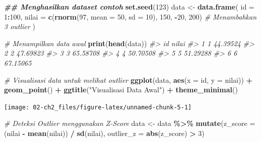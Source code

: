 \documentclass[
  oneside]{book}
\newenvironment{Shaded}{\begin{snugshade}}{\end{snugshade}}
\newcommand{\AttributeTok}[1]{\textcolor[rgb]{0.13,0.29,0.53}{#1}}
\newcommand{\CommentTok}[1]{\textcolor[rgb]{0.56,0.35,0.01}{\textit{#1}}}
\newcommand{\DecValTok}[1]{\textcolor[rgb]{0.00,0.00,0.81}{#1}}
\newcommand{\DocumentationTok}[1]{\textcolor[rgb]{0.56,0.35,0.01}{\textbf{\textit{#1}}}}
\newcommand{\FunctionTok}[1]{\textcolor[rgb]{0.13,0.29,0.53}{\textbf{#1}}}
\newcommand{\NormalTok}[1]{#1}
\newcommand{\OtherTok}[1]{\textcolor[rgb]{0.56,0.35,0.01}{#1}}
\newcommand{\SpecialCharTok}[1]{\textcolor[rgb]{0.81,0.36,0.00}{\textbf{#1}}}
\newcommand{\StringTok}[1]{\textcolor[rgb]{0.31,0.60,0.02}{#1}}
\begin{document}
\begin{Shaded}
\begin{Highlighting}[]
\DocumentationTok{\#\# Menghasilkan dataset contoh}
\FunctionTok{set.seed}\NormalTok{(}\DecValTok{123}\NormalTok{)}
\NormalTok{data }\OtherTok{\textless{}{-}} \FunctionTok{data.frame}\NormalTok{(}
  \AttributeTok{id =} \DecValTok{1}\SpecialCharTok{:}\DecValTok{100}\NormalTok{,}
  \AttributeTok{nilai =} \FunctionTok{c}\NormalTok{(}\FunctionTok{rnorm}\NormalTok{(}\DecValTok{97}\NormalTok{, }\AttributeTok{mean =} \DecValTok{50}\NormalTok{, }\AttributeTok{sd =} \DecValTok{10}\NormalTok{), }\DecValTok{150}\NormalTok{, }\SpecialCharTok{{-}}\DecValTok{20}\NormalTok{, }\DecValTok{200}\NormalTok{)  }\CommentTok{\# Menambahkan 3 outlier}
\NormalTok{)}
\end{Highlighting}
\end{Shaded}

\begin{Shaded}
\begin{Highlighting}[]
\CommentTok{\# Menampilkan data awal}
\FunctionTok{print}\NormalTok{(}\FunctionTok{head}\NormalTok{(data))}
\CommentTok{\#\textgreater{}   id    nilai}
\CommentTok{\#\textgreater{} 1  1 44.39524}
\CommentTok{\#\textgreater{} 2  2 47.69823}
\CommentTok{\#\textgreater{} 3  3 65.58708}
\CommentTok{\#\textgreater{} 4  4 50.70508}
\CommentTok{\#\textgreater{} 5  5 51.29288}
\CommentTok{\#\textgreater{} 6  6 67.15065}
\end{Highlighting}
\end{Shaded}

\begin{Shaded}
\begin{Highlighting}[]
\CommentTok{\# Visualisasi data untuk melihat outlier}
\FunctionTok{ggplot}\NormalTok{(data, }\FunctionTok{aes}\NormalTok{(}\AttributeTok{x =}\NormalTok{ id, }\AttributeTok{y =}\NormalTok{ nilai)) }\SpecialCharTok{+}
  \FunctionTok{geom\_point}\NormalTok{() }\SpecialCharTok{+}
  \FunctionTok{ggtitle}\NormalTok{(}\StringTok{"Visualisasi Data Awal"}\NormalTok{) }\SpecialCharTok{+}
  \FunctionTok{theme\_minimal}\NormalTok{()}
\end{Highlighting}
\end{Shaded}

\begin{center}\texttt{[image: 02-ch2\_files/figure-latex/unnamed-chunk-5-1]} \end{center}

\begin{Shaded}
\begin{Highlighting}[]
\CommentTok{\# Deteksi Outlier menggunakan Z{-}Score}
\NormalTok{data }\OtherTok{\textless{}{-}}\NormalTok{ data }\SpecialCharTok{\%\textgreater{}\%}
  \FunctionTok{mutate}\NormalTok{(}\AttributeTok{z\_score =}\NormalTok{ (nilai }\SpecialCharTok{{-}} \FunctionTok{mean}\NormalTok{(nilai)) }\SpecialCharTok{/} \FunctionTok{sd}\NormalTok{(nilai),}
         \AttributeTok{outlier\_z =} \FunctionTok{abs}\NormalTok{(z\_score) }\SpecialCharTok{\textgreater{}} \DecValTok{3}\NormalTok{)}
\end{Highlighting}
\end{Shaded}
\end{document}
